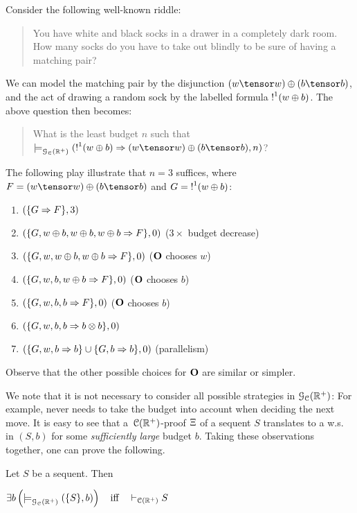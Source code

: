 \begin{example}\label{ex:riddle}
Consider the following well-known riddle:
\begin{quote}
You have white and black socks in a drawer in a completely dark room. How many socks do you have to take out blindly to be sure of having a matching pair? 
\end{quote}
We can model the matching pair by the disjunction $(w\tensor w)\oplus(b\tensor b)$, and the act of drawing a random sock by the labelled formula $\hbox{$\mathop{!}^{1}$}(w\oplus b)$. The above question then becomes:
\begin{quote}
What is the least budget $n$  such that $\wins{}{\GAIMALLR}(\nbang{1}(w\oplus b)\seq (w\tensor w)\oplus(b\tensor b),n)$?
\end{quote}
The following play illustrate that $n=3$ suffices, where $F=(w\tensor w)\oplus(b\tensor b)$ and $G=\hbox{$\mathop{!}^{1}$}(w\oplus b)$: \\
\begin{enumerate}
\item $(\{G\Rightarrow F\},3)$ 
\item $(\{G, w\oplus b, w\oplus b, w\oplus b\Rightarrow F\},0)$ ($3\times$ budget decrease)
\item $(\{G, w, w\oplus b, w\oplus b\Rightarrow F\},0)$ ($\mathbf{O}$ chooses $w$)
\item $(\{G, w, b, w\oplus b\Rightarrow F\},0)$ ($\mathbf{O}$ chooses $b$)
\item $(\{G, w, b, b\Rightarrow F\},0)$ ($\mathbf{O}$ chooses $b$)
\item $(\{G, w, b, b\Rightarrow b\otimes b\},0)$ 
\item $(\{G, w, b\Rightarrow b\}\cup \{G, b\Rightarrow b\},0)$ (parallelism)
\end{enumerate}
Observe that the other possible choices for $\mathbf{O}$ are similar or simpler. 
\end{example}
We note that it is not necessary to consider all possible strategies in $\mathcal{G}_{\mathcal{C}}(\mathbb{R}^+)$: For example, \I never needs to take the budget into account when deciding the next move. It is easy to see that a~$\mathcal{C}(\mathbb{R}^+)$-proof $\Xi$ of a sequent $S$ translates to a w.s. in $(S,b)$ for some \textit{sufficiently large} budget $b$. Taking these observations together, one can prove the following.
\begin{theorem}
\label{theorem:wadeq}
Let $S$ be a sequent. Then

$\exists b\left(\models^{}_{\mathcal{G}_{\mathcal{C}}(\mathbb{R}^+)}(\{S\},b)\right)\quad\mbox{iff}\quad\vdash_{\mathcal{C}(\mathbb{R}^+)} S$
\end{theorem}
